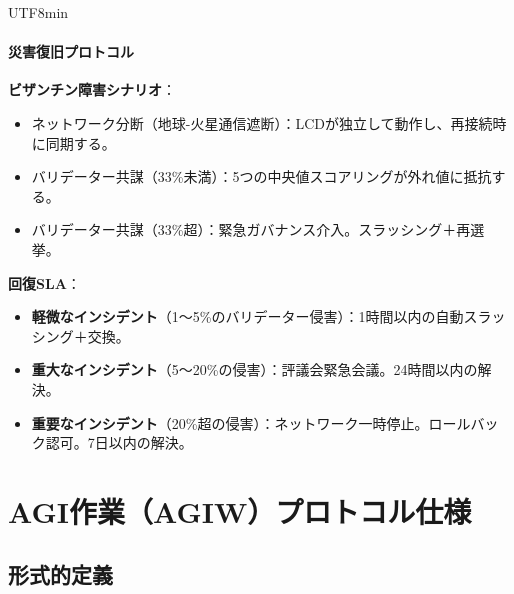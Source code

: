 \documentclass[11pt]{article}
\begin{document}
\begin{CJK}{UTF8}{min}
\paragraph{災害復旧プロトコル}
\textbf{ビザンチン障害シナリオ}：
\begin{itemize}[noitemsep]
  \item ネットワーク分断（地球-火星通信遮断）：LCDが独立して動作し、再接続時に同期する。
  \item バリデーター共謀（33\%未満）：5つの中央値スコアリングが外れ値に抵抗する。
  \item バリデーター共謀（33\%超）：緊急ガバナンス介入。スラッシング＋再選挙。
\end{itemize}

\textbf{回復SLA}：
\begin{itemize}[noitemsep]
  \item \textbf{軽微なインシデント}（1〜5\%のバリデーター侵害）：1時間以内の自動スラッシング＋交換。
  \item \textbf{重大なインシデント}（5〜20\%の侵害）：評議会緊急会議。24時間以内の解決。
  \item \textbf{重要なインシデント}（20\%超の侵害）：ネットワーク一時停止。ロールバック認可。7日以内の解決。
\end{itemize}

\section{AGI作業（AGIW）プロトコル仕様}
\label{sec:agiw-spec}

\subsection{形式的定義}

\end{CJK}
\end{document}
